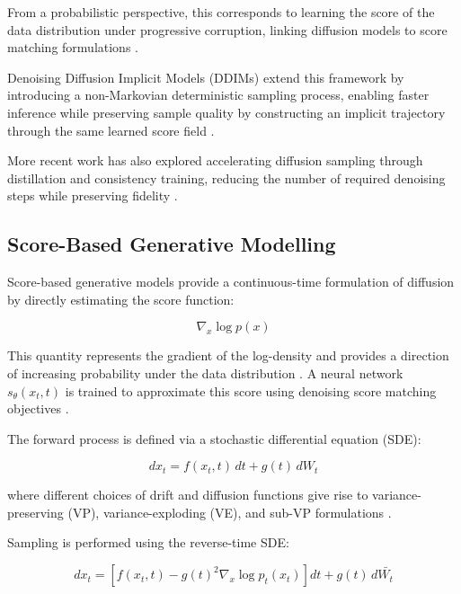 \documentclass[a4paper,twoside,12pt]{report}
\begin{document}
From a probabilistic perspective, this corresponds to learning the score of the data distribution under progressive corruption, linking diffusion models to score matching formulations \citep{hyvarinen2005score,song2021score}.

Denoising Diffusion Implicit Models (DDIMs) extend this framework by introducing a non-Markovian deterministic sampling process, enabling faster inference while preserving sample quality by constructing an implicit trajectory through the same learned score field \citep{song2022ddim}.

More recent work has also explored accelerating diffusion sampling through distillation and consistency training, reducing the number of required denoising steps while preserving fidelity \citep{salimans2022progressivedistillation,song2023consistency}.
\subsection{Score-Based Generative Modelling}

Score-based generative models provide a continuous-time formulation of diffusion by directly estimating the score function:

\begin{equation}
\nabla_x \log p(x)
\end{equation}

This quantity represents the gradient of the log-density and provides a direction of increasing probability under the data distribution \citep{hyvarinen2005score}. A neural network \(s_\theta(x_t, t)\) is trained to approximate this score using denoising score matching objectives \citep{vincent2011connection,song2021score}.

The forward process is defined via a stochastic differential equation (SDE):

\begin{equation}
dx_t = f(x_t, t)\,dt + g(t)\,dW_t
\end{equation}

where different choices of drift and diffusion functions give rise to variance-preserving (VP), variance-exploding (VE), and sub-VP formulations \citep{song2021scorebasedgenerative}.

Sampling is performed using the reverse-time SDE:

\begin{equation}
dx_t = \left[f(x_t, t) - g(t)^2 \nabla_x \log p_t(x_t)\right]dt + g(t)\,d\bar{W_t}
\end{equation}
\end{document}
